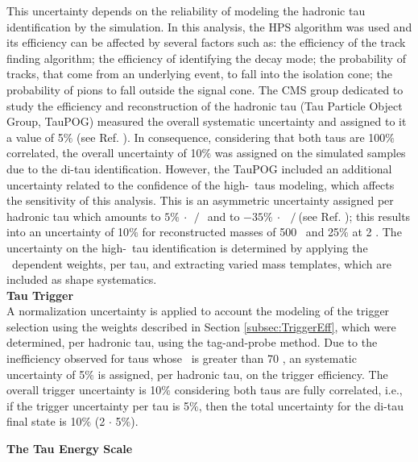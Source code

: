 \noindent This uncertainty depends on the reliability of 
modeling the hadronic tau identification by the simulation.
In this analysis, the HPS algorithm was used and its efficiency can 
be affected by several factors such as: the efficiency
of the track finding algorithm; the efficiency of
identifying the decay mode; the probability of tracks, that
come from an underlying event, to fall into the isolation cone;
the probability of pions to fall outside the signal cone. The CMS group
dedicated to study the efficiency and reconstruction of 
the hadronic tau (Tau Particle Object Group, TauPOG) measured 
the overall systematic uncertainty and assigned to 
it a value of 5$\%$ (see Ref. \cite{TauPOG}). In consequence, considering 
that both taus are 100$\%$ correlated, the overall uncertainty 
of 10$\%$ was assigned on the simulated samples due 
to the di-tau identification. However, the TauPOG included an additional
uncertainty related to the confidence of the high-\pt~taus 
modeling, which affects the sensitivity of this analysis.
This is an asymmetric uncertainty assigned per hadronic tau 
which amounts to $5\%~\cdot~$\pt$~/~$\TeV~and to $-35\%~\cdot$~\pt$~/~$\TeV (see Ref. \cite{TauPOG});
this results into an uncertainty of 10$\%$ for 
reconstructed masses of 500 \GeV~and 25$\%$ at 2 \TeV. The uncertainty on the 
high-\pt~tau identification is determined by applying the \pt~dependent 
weights, per tau, and extracting varied mass templates, which are included 
as shape systematics.\\

\textbf{Tau Trigger}\\

\noindent A normalization uncertainty is applied to account the modeling
of the trigger selection using the weights described in 
Section \ref{subsec:TriggerEff}, which were determined, per hadronic tau,
using the tag-and-probe method. Due to the inefficiency
observed for taus whose \pt~is greater than 70 \GeV, 
an systematic uncertainty of 5$\%$ is assigned, per 
hadronic tau, on the trigger efficiency. The overall trigger 
uncertainty is 10$\%$ considering both taus are fully 
correlated, i.e., if the trigger uncertainty per tau is 5$\%$, then the total uncertainty 
for the di-tau final state is 10$\%$ (2 $\cdot$ 5$\%$). \\

\vspace{1.0cm}

\textbf{The Tau Energy Scale}\\

